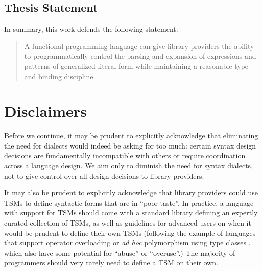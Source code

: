 \subsection*{Thesis Statement}
In summary, this work defends the following statement:

\begin{quote}
A functional programming language can give library providers the ability to %
programmatically control the parsing and expansion of expressions and patterns of generalized literal form while maintaining a reasonable type and binding discipline. %
\end{quote}
\section{Disclaimers}
Before we continue, it may be prudent to explicitly acknowledge that eliminating the need for dialects would indeed be asking for too much: certain syntax design decisions are fundamentally incompatible with others or require coordination across a language design. We aim only to diminish the need for syntax dialects, not to give control over all design decisions to library providers. %

It may also be prudent to explicitly acknowledge that library providers could use TSMs  to define syntactic forms that are in ``poor taste''. In practice, a language with support for TSMs should come with a standard library defining an expertly curated collection of TSMs, as well as guidelines for advanced users on when it would be prudent to define their own TSMs (following the example of languages that support operator overloading or \emph{ad hoc} polymorphism using type classes \cite{Hall:1996:TCH:227699.227700,conf/popl/DreyerHCK07}, which also have some potential for ``abuse'' or ``overuse''.) %
The majority of programmers should very rarely need to define a TSM on their own.

